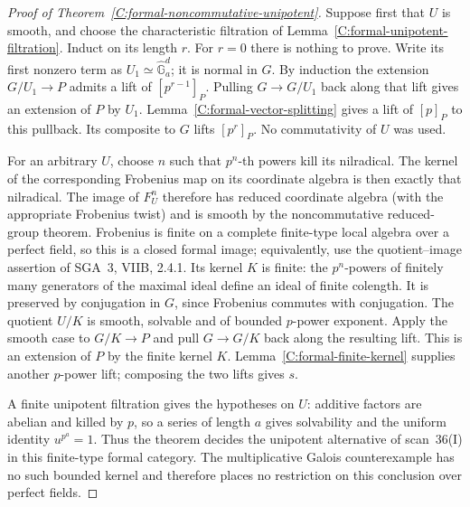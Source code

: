 \begin{proof}[Proof of Theorem~\ref{C:formal-noncommutative-unipotent}]
Suppose first that $U$ is smooth, and choose the characteristic
filtration of Lemma~\ref{C:formal-unipotent-filtration}.  Induct on
its length $r$.  For $r=0$ there is nothing to prove.  Write its first
nonzero term as $U_1\simeq\widehat{\mathbb G}_a^d$; it is normal
in $G$.  By induction the extension $G/U_1\to P$ admits a lift of
$[p^{r-1}]_P$.  Pulling $G\to G/U_1$ back along that lift gives an
extension of $P$ by $U_1$.  Lemma~\ref{C:formal-vector-splitting}
gives a lift of $[p]_P$ to this pullback.  Its composite to $G$ lifts
$[p^r]_P$.  No commutativity of $U$ was used.

For an arbitrary $U$, choose $n$ such that $p^n$-th powers kill its
nilradical.  The kernel of the corresponding Frobenius map on its
coordinate algebra is then exactly that nilradical.  The image of
$F_U^n$ therefore has reduced coordinate algebra (with the appropriate
Frobenius twist) and is smooth by the noncommutative reduced-group
theorem.  Frobenius is finite on a complete finite-type local algebra
over a perfect field, so this is a closed formal image; equivalently,
use the quotient--image assertion of SGA~3, VIIB, 2.4.1.
Its kernel $K$ is finite: the $p^n$-powers of finitely many generators
of the maximal ideal define an ideal of finite colength.
It is preserved by conjugation in $G$, since Frobenius commutes with
conjugation.  The quotient $U/K$ is smooth, solvable and of bounded
$p$-power exponent.  Apply the smooth case to $G/K\to P$ and pull
$G\to G/K$ back along the resulting lift.  This is an extension
of $P$ by the finite kernel $K$.  Lemma~\ref{C:formal-finite-kernel}
supplies another $p$-power lift; composing the two lifts gives $s$.

A finite unipotent filtration gives the hypotheses on $U$: additive
factors are abelian and killed by $p$, so a series of length $a$
gives solvability and the uniform identity $u^{p^a}=1$.
Thus the theorem decides the unipotent alternative of scan~36(I)
in this finite-type formal category.  The multiplicative Galois
counterexample has no such bounded kernel and therefore places no
restriction on this conclusion over perfect fields.
\end{proof}

